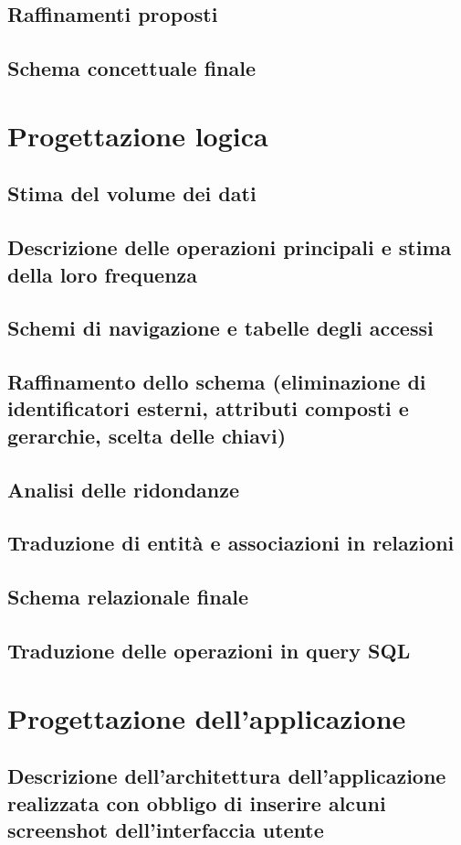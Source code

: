 \documentclass[a4paper,12pt]{report}
\begin{document}
\section{Raffinamenti proposti}
\section{Schema concettuale finale}
\chapter{Progettazione logica}
\section{Stima del volume dei dati}
\section{Descrizione delle operazioni principali e stima della loro frequenza}
\section{Schemi di navigazione e tabelle degli accessi}
\section{Raffinamento dello schema (eliminazione di identificatori esterni, attributi composti e gerarchie, scelta delle chiavi)}
\section{Analisi delle ridondanze}
\section{Traduzione di entità e associazioni in relazioni}
\section{Schema relazionale finale}
\section{Traduzione delle operazioni in query SQL}
\chapter{Progettazione dell'applicazione}
\section{Descrizione dell'architettura dell'applicazione realizzata con obbligo di inserire alcuni screenshot dell'interfaccia utente}
\end{document}

